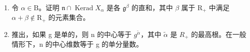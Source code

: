 \begin{enumerate}
\def\labelenumi{\alph{enumi})}
\item
  令 \(\alpha \in \mathrm{B}\)。证明 \(\mathfrak{n} \cap \operatorname{Kerad} X_{\alpha}\) 是各 \(\mathfrak{g}^{\beta}\) 的直和，其中 \(\beta\) 属于 \(\mathrm{R}_{+}\) 中满足 \(\alpha + \beta \notin \mathrm{R}_{+}\) 的元素集合。
\item
  推出，如果 g 是单的，则 n 的中心等于 \(g^{\tilde{\alpha}}\)，其中 \(\tilde{\alpha}\) 是 \(R_{+}\) 的最高根。在一般情形下，n 的中心维数等于 g 的单分量数。
\end{enumerate}